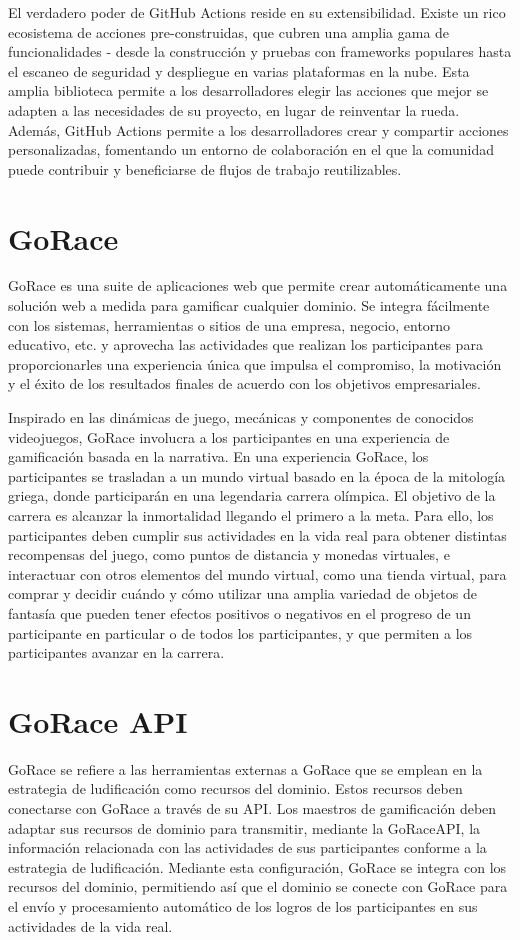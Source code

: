 El verdadero poder de GitHub Actions reside en su extensibilidad.  Existe un rico ecosistema de acciones pre-construidas, que cubren una amplia gama de funcionalidades - desde la construcción y pruebas con frameworks populares hasta el escaneo de seguridad y despliegue en varias plataformas en la nube.  Esta amplia biblioteca permite a los desarrolladores elegir las acciones que mejor se adapten a las necesidades de su proyecto, en lugar de reinventar la rueda.  Además, GitHub Actions permite a los desarrolladores crear y compartir acciones personalizadas, fomentando un entorno de colaboración en el que la comunidad puede contribuir y beneficiarse de flujos de trabajo reutilizables.

\section{GoRace}
GoRace\cite{gorace} es una suite de aplicaciones web que permite crear automáticamente una solución web a medida para gamificar cualquier dominio. Se integra fácilmente con los sistemas, herramientas o sitios de una empresa, negocio, entorno educativo, etc. y aprovecha las actividades que realizan los participantes para proporcionarles una experiencia única que impulsa el compromiso, la motivación y el éxito de los resultados finales de acuerdo con los objetivos empresariales.

Inspirado en las dinámicas de juego, mecánicas y componentes de conocidos videojuegos, GoRace involucra a los participantes en una experiencia de gamificación basada en la narrativa. En una experiencia GoRace, los participantes se trasladan a un mundo virtual basado en la época de la mitología griega, donde participarán en una legendaria carrera olímpica. El objetivo de la carrera es alcanzar la inmortalidad llegando el primero a la meta. Para ello, los participantes deben cumplir sus actividades en la vida real para obtener distintas recompensas del juego, como puntos de distancia y monedas virtuales, e interactuar con otros elementos del mundo virtual, como una tienda virtual, para comprar y decidir cuándo y cómo utilizar una amplia variedad de objetos de fantasía que pueden tener efectos positivos o negativos en el progreso de un participante en particular o de todos los participantes, y que permiten a los participantes avanzar en la carrera.

\section{GoRace API}
GoRace se refiere a las herramientas externas a GoRace que se emplean en la estrategia de ludificación como recursos del dominio. Estos recursos deben conectarse con GoRace a través de su \acrshort{API}. Los maestros de gamificación deben adaptar sus recursos de dominio para transmitir, mediante la GoRaceAPI, la información relacionada con las actividades de sus participantes conforme a la estrategia de ludificación. Mediante esta configuración, GoRace se integra con los recursos del dominio, permitiendo así que el dominio se conecte con GoRace para el envío y procesamiento automático de los logros de los participantes en sus actividades de la vida real.
